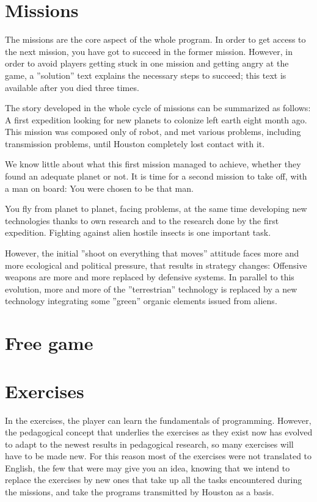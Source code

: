 \chapter{Missions}

The missions are the core aspect of the whole program. In order to get access to the next mission, you have got to succeed in the former mission. However, in order to avoid players getting stuck in one mission and getting angry at the game, a ''solution'' text explains the necessary steps to succeed; this text is available after you died three times.

The story developed in the whole cycle of missions can be summarized as follows: A first expedition looking for new planets to colonize left earth eight month ago. This mission was composed only of robot, and met various problems, including transmission problems, until Houston completely lost contact with it.

We know little about what this first mission managed to achieve, whether they found an adequate planet or not. It is time for a second mission to take off, with a man on board: You were chosen to be that man.

You fly from planet to planet, facing problems, at the same time developing new technologies thanks to own research and to the research done by the first expedition. Fighting against alien hostile insects is one important task.

However, the initial ''shoot on everything that moves'' attitude faces more and more ecological and political pressure, that results in strategy changes: Offensive weapons are more and more replaced by defensive systems. In parallel to this evolution, more and more of the ''terrestrian'' technology is replaced by a new technology integrating some ''green'' organic elements issued from aliens.


\chapter{Free game}



\chapter{Exercises}

In the exercises, the player can learn the fundamentals of programming. However, the pedagogical concept that underlies the exercises as they exist now has evolved to adapt to the newest results in pedagogical research, so many exercises will have to be made new. For this reason most of the exercises were not translated to English, the few that were may give you an idea, knowing that we intend to replace the exercises by new ones that take up all the tasks encountered during the missions, and take the programs transmitted by Houston as a basis.


